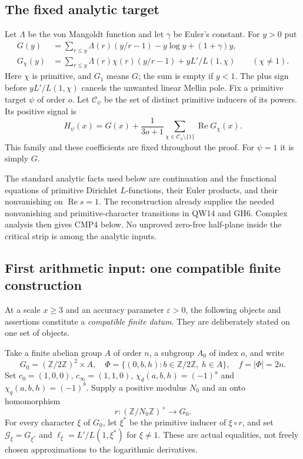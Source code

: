\documentclass[11pt,a4paper]{article}
\numberwithin{equation}{section}
\theoremstyle{remark}\newtheorem{remark}[theorem]{Remark}
\begin{document}
\subsection{The fixed analytic target}

Let $\Lambda$ be the von Mangoldt function and let $\gamma$ be
Euler's constant.  For $y>0$ put
\begin{align*}
 G(y)&=\sum_{r\le y}\Lambda(r)(y/r-1)
                         -y\log y+(1+\gamma)y,\\
 G_\chi(y)&=\sum_{r\le y}\Lambda(r)\chi(r)(y/r-1)
                         +yL'/L(1,\chi)\qquad(\chi\ne1).
\end{align*}
Here $\chi$ is primitive, and $G_1$ means $G$; the sum is empty
if $y<1$.  The plus sign before $yL'/L(1,\chi)$ cancels the
unwanted linear Mellin pole.  Fix a primitive target $\psi$ of
order $o$.  Let $\mathcal C_\psi$ be the set of distinct primitive
inducers of its powers.  Its positive signal is
\[
 H_\psi(x)=G(x)+\frac1{3o+1}
             \sum_{\chi\in\mathcal C_\psi\setminus\{1\}}
                                      \operatorname{Re}G_\chi(x).
 \tag{CMP.1}
\]
This family and these coefficients are fixed throughout the proof.
For $\psi=1$ it is simply $G$.

The standard analytic facts used below are continuation and the
functional equations of primitive Dirichlet $L$-functions, their
Euler products, and their nonvanishing on $\operatorname{Re}s=1$.
The reconstruction already supplies the needed nonvanishing and
primitive-character transitions in QW14 and GH6.  Complex analysis
then gives CMP4 below.  No unproved zero-free half-plane inside the
critical strip is among the analytic inputs.

\subsection{First arithmetic input: one compatible finite construction}

At a scale $x\ge3$ and an accuracy parameter $\varepsilon>0$,
the following objects and assertions constitute a
\emph{compatible finite datum}.  They are deliberately stated on
one set of objects.

Take a finite abelian group $A$ of order $n$, a subgroup $A_0$ of
index $o$, and write
\[
 G_0=(\mathbb Z/2\mathbb Z)^2\times A,\quad
 \Phi=\{(0,\allowbreak{} b,\allowbreak{} h):b\in\mathbb Z/2\mathbb Z,\ h\in A\},
 \quad f=|\Phi|=2n.
\]
Set $c_0=(1,0,0)$, $c_\infty=(1,1,0)$,
$\chi_d(a,\allowbreak{} b,\allowbreak{} h)=(-1)^a$ and $\chi_q(a,\allowbreak{} b,\allowbreak{} h)=(-1)^b$.
Supply a positive modulus $N_0$ and an onto homomorphism
\[
 r:(\mathbb Z/N_0\mathbb Z)^\times\longrightarrow G_0.
\]
For every character $\xi$ of $G_0$, let $\xi^*$ be the primitive
inducer of $\xi\circ r$, and set
$\mathcal G_\xi=G_{\xi^*}$ and
$\ell_\xi=L'/L(1,\xi^*)$ for $\xi\ne1$.
These are actual equalities, not freely chosen approximations to
the logarithmic derivatives.
\end{document}
